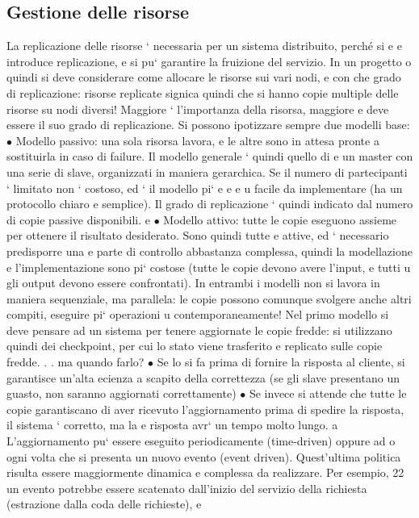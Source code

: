 \documentclass[a4paper,12pt]{article}
\begin{document}
\subsection{Gestione delle risorse}
La replicazione delle risorse ` necessaria per un sistema distribuito, perché si
e
e
introduce replicazione, e si pu` garantire la fruizione del servizio. In un progetto
o
quindi si deve considerare come allocare le risorse sui vari nodi, e con che grado di replicazione: risorse replicate
signica quindi che si hanno copie multiple
delle risorse su nodi diversi! Maggiore ` l'importanza della risorsa, maggiore
e
deve essere il suo grado di replicazione.
Si possono ipotizzare sempre due modelli base:
$\bullet$ Modello passivo: una sola risorsa lavora, e le altre sono in attesa pronte
a sostituirla in caso di failure. Il modello generale ` quindi quello di
e
un master con una serie di slave, organizzati in maniera gerarchica. Se
il numero di partecipanti ` limitato non ` costoso, ed ` il modello pi`
e
e
e
u
facile da implementare (ha un protocollo chiaro e semplice). Il grado di
replicazione ` quindi indicato dal numero di copie passive disponibili.
e
$\bullet$ Modello attivo: tutte le copie eseguono assieme per ottenere il risultato
desiderato. Sono quindi tutte e attive, ed ` necessario predisporre una
e
parte di controllo abbastanza complessa, quindi la modellazione e l'implementazione sono pi` costose (tutte le copie
devono avere l'input, e tutti
u
gli output devono essere confrontati).
In entrambi i modelli non si lavora in maniera sequenziale, ma parallela: le
copie possono comunque svolgere anche altri compiti, eseguire pi` operazioni
u
contemporaneamente!
Nel primo modello si deve pensare ad un sistema per tenere aggiornate le
copie fredde: si utilizzano quindi dei checkpoint, per cui lo stato viene trasferito
e replicato sulle copie fredde. . . ma quando farlo?
$\bullet$ Se lo si fa prima di fornire la risposta al cliente, si garantisce un'alta
ecienza a scapito della correttezza (se gli slave presentano un guasto,
non saranno aggiornati correttamente)
$\bullet$ Se invece si attende che tutte le copie garantiscano di aver ricevuto l'aggiornamento prima di spedire la
risposta, il sistema ` corretto, ma la
e
risposta avr` un tempo molto lungo.
a
L'aggiornamento pu` essere eseguito periodicamente (time-driven) oppure ad
o
ogni volta che si presenta un nuovo evento (event driven). Quest'ultima politica
risulta essere maggiormente dinamica e complessa da realizzare. Per esempio,
22
un evento potrebbe essere scatenato dall'inizio del servizio della richiesta (estrazione dalla coda delle richieste), e
\end{document}

